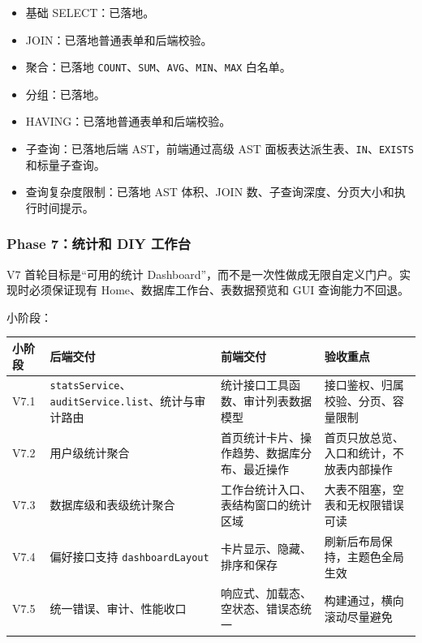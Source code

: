 \documentclass[
  a4paper,
  UTF8]{ctexart}
\providecommand{\tightlist}{%
  \setlength{\itemsep}{0pt}\setlength{\parskip}{0pt}}
\begin{document}
\begin{itemize}
\tightlist
\item
  基础 SELECT：已落地。
\item
  JOIN：已落地普通表单和后端校验。
\item
  聚合：已落地
  \texttt{COUNT}、\texttt{SUM}、\texttt{AVG}、\texttt{MIN}、\texttt{MAX}
  白名单。
\item
  分组：已落地。
\item
  HAVING：已落地普通表单和后端校验。
\item
  子查询：已落地后端 AST，前端通过高级 AST
  面板表达派生表、\texttt{IN}、\texttt{EXISTS} 和标量子查询。
\item
  查询复杂度限制：已落地 AST 体积、JOIN
  数、子查询深度、分页大小和执行时间提示。
\end{itemize}

\hypertarget{phase-7ux7edfux8ba1ux548c-diy-ux5de5ux4f5cux53f0}{%
\subsubsection{Phase 7：统计和 DIY
工作台}\label{phase-7ux7edfux8ba1ux548c-diy-ux5de5ux4f5cux53f0}}

V7 首轮目标是``可用的统计
Dashboard''，而不是一次性做成无限自定义门户。实现时必须保证现有
Home、数据库工作台、表数据预览和 GUI 查询能力不回退。

小阶段：

\begin{longtable}[]{@{}
  >{\raggedright\arraybackslash}p{}
  >{\raggedright\arraybackslash}p{}
  >{\raggedright\arraybackslash}p{}
  >{\raggedright\arraybackslash}p{}@{}}
\toprule
小阶段 & 后端交付 & 前端交付 & 验收重点 \\
\midrule
\endhead
V7.1 & \texttt{statsService}、\texttt{auditService.list}、统计与审计路由
& 统计接口工具函数、审计列表数据模型 &
接口鉴权、归属校验、分页、容量限制 \\
V7.2 & 用户级统计聚合 & 首页统计卡片、操作趋势、数据库分布、最近操作 &
首页只放总览、入口和统计，不放表内部操作 \\
V7.3 & 数据库级和表级统计聚合 & 工作台统计入口、表结构窗口的统计区域 &
大表不阻塞，空表和无权限错误可读 \\
V7.4 & 偏好接口支持 \texttt{dashboardLayout} &
卡片显示、隐藏、排序和保存 & 刷新后布局保持，主题色全局生效 \\
V7.5 & 统一错误、审计、性能收口 & 响应式、加载态、空状态、错误态统一 &
构建通过，横向滚动尽量避免 \\
\bottomrule
\end{longtable}
\end{document}

